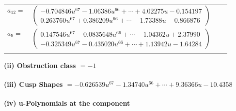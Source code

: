 \documentclass[1p]{elsarticle_modified}
\theoremstyle{definition}
\begin{document}
\begin{tabular}{m{7pt} m{180pt} m{7pt} m{180pt} }
\flushright $a_{12}=$&$\begin{pmatrix}-0.704846 u^{67}-1.06386 u^{66}+\cdots+4.02275 u-0.154197\\0.263760 u^{67}+0.386209 u^{66}+\cdots-1.73388 u-0.866876\end{pmatrix}$ \\
\flushright $a_{9}=$&$\begin{pmatrix}0.147546 u^{67}-0.0835648 u^{66}+\cdots-1.04362 u+2.37990\\-0.325349 u^{67}-0.435020 u^{66}+\cdots+1.13942 u-1.64284\end{pmatrix}$\\&\end{tabular}
\flushleft \textbf{(ii) Obstruction class $= -1$}\\~\\
\flushleft \textbf{(iii) Cusp Shapes $= -0.626539 u^{67}-1.34740 u^{66}+\cdots+9.36366 u-10.4358$}\\~\\
\newpage\renewcommand{\arraystretch}{1}
\flushleft \textbf{(iv) u-Polynomials at the component}\newline \\
\end{document}
